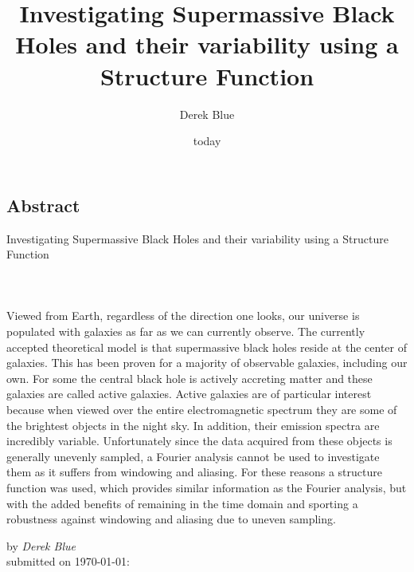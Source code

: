 \documentclass[12pt, oneside]{smuthesis}
\newcommand{\myTitle}{Investigating Supermassive Black Holes and their variability using a Structure Function}
\begin{document}
\frontmatter
\title{\sc \myTitle}
\author{Derek Blue}
\date{today}
\medskip

\maketitle
\pagestyle{headings}

\begin{center}
\section*{\center \sc Abstract} \label{abstract}
\sc \myTitle
\paragraph*{\center  \\}
\end{center}
Viewed from Earth, regardless of the direction one looks, our universe is populated with galaxies as far as we can currently observe. The currently accepted theoretical model is that supermassive black holes reside at the center of galaxies. This has been proven for a majority of observable galaxies, including our own. For some the central black hole is actively accreting matter and these galaxies are called active galaxies. Active galaxies are of particular interest because when viewed over the entire electromagnetic spectrum they are some of the brightest objects in the night sky. In addition, their emission spectra are incredibly variable. Unfortunately since the data acquired from these objects is generally unevenly sampled, a Fourier analysis cannot be used to investigate them as it suffers from windowing and aliasing. For these reasons a structure function was used, which provides similar information as the Fourier analysis, but with the added benefits of remaining in the time domain and sporting a robustness against windowing and aliasing due to uneven sampling.

\begin{center}
by {\em Derek Blue}\\
submitted on \today:\\
\end{center}
\newpage

\tableofcontents
\listoffigures
\listoftables
\newpage
%
\mainmatter
\end{document}
